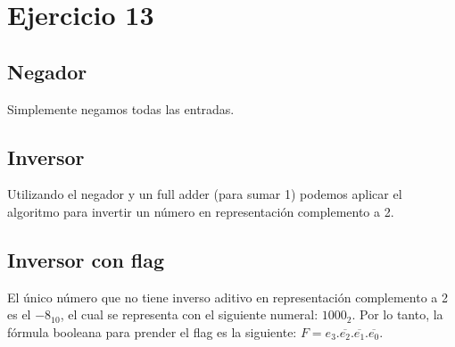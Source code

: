 \section{Ejercicio 13}

\subsection{Negador}

Simplemente negamos todas las entradas.

\begin{figure}[ht]
    
\end{figure}

\subsection{Inversor}

Utilizando el negador y un full adder (para sumar 1) podemos aplicar el algoritmo para invertir un número en representación complemento a 2.

\begin{figure}[ht]
    
\end{figure}

\subsection{Inversor con flag}

El único número que no tiene inverso aditivo en representación complemento a 2 es el $-8_{10}$, el cual se representa con el siguiente numeral: $1000_2$. Por lo tanto, la fórmula booleana para prender el flag es la siguiente: $F = e_3 . \overline{e_2} . \overline{e_1} . \overline{e_0}$.

\begin{figure}[ht]
    
\end{figure}


